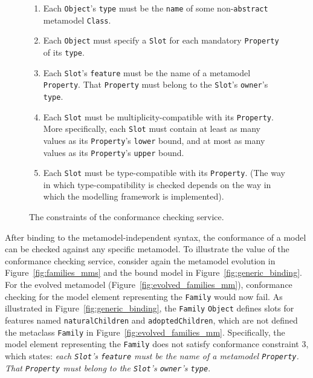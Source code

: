 \begin{figure}[p]
	\begin{framed}
	  \begin{enumerate}
			\item Each \texttt{Ob\-je\-ct}'s \texttt{ty\-pe} must be the \texttt{na\-me} of some non-\texttt{ab\-str\-act} metamodel \texttt{Cl\-a\-ss}.
			\item Each \texttt{Ob\-je\-ct} must specify a \texttt{Sl\-ot} for each mandatory \texttt{Pr\-op\-er\-ty} of its \texttt{ty\-pe}.
			\item Each \texttt{Sl\-ot}'s \texttt{fe\-at\-u\-re} must be the name of a metamodel \texttt{Pr\-op\-er\-ty}. That \texttt{Pr\-op\-er\-ty} must belong to the \texttt{Sl\-ot}'s \texttt{ow\-n\-er}'s \texttt{ty\-pe}.
			\item Each \texttt{Sl\-ot} must be multiplicity-compatible with its \texttt{Pr\-op\-er\-ty}. More specifically, each \texttt{Sl\-ot} must contain at least as many values as its \texttt{Pr\-op\-er\-ty}'s \texttt{lo\-w\-er} bound, and at most as many values as its \texttt{Pr\-op\-er\-ty}'s \texttt{up\-p\-er} bound.
		  \item Each \texttt{Sl\-ot} must be type-compatible with its \texttt{Pr\-op\-er\-ty}. (The way in which type-compatibility is checked depends on the way in which the modelling framework is implemented).
		\end{enumerate}
	\end{framed}
  \caption{The constraints of the conformance checking service.}
  \label{fig:conformance_checking_constraints}
\end{figure}

After binding to the metamodel-independent syntax, the conformance of a model can be checked against any specific metamodel. To illustrate the value of the conformance checking service, consider again the metamodel evolution in Figure~\ref{fig:families_mms} and the bound model in Figure~\ref{fig:generic_binding}. For the evolved metamodel (Figure~\ref{fig:evolved_families_mm}), conformance checking for the model element representing the \texttt{Fa\-mi\-ly} would now fail. As illustrated in Figure~\ref{fig:generic_binding}, the \texttt{Fa\-mi\-ly} \texttt{Ob\-je\-ct} defines slots for features named  \texttt{na\-tu\-r\-alCh\-il\-dr\-en} and \texttt{ad\-op\-t\-edCh\-il\-dr\-en}, which are not defined the metaclass \texttt{Fa\-mi\-ly} in Figure~\ref{fig:evolved_families_mm}. Specifically, the model element representing the \texttt{Fa\-mi\-ly} does not satisfy conformance constraint 3, which states: \emph{each \texttt{Sl\-ot}'s \texttt{fe\-at\-u\-re} must be the name of a metamodel \texttt{Pr\-op\-er\-ty}. That \texttt{Pr\-op\-er\-ty} must belong to the \texttt{Sl\-ot}'s \texttt{ow\-n\-er}'s \texttt{ty\-pe}}.

